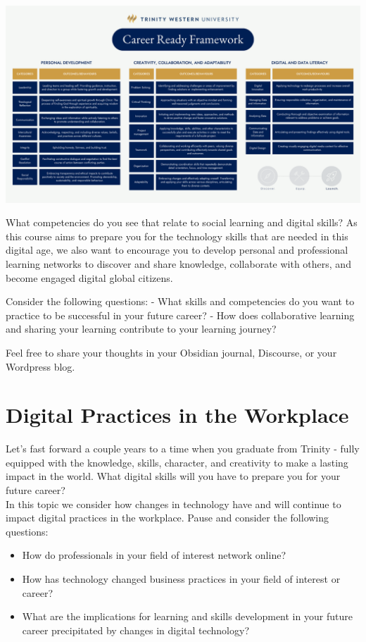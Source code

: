 \documentclass[
]{book}
\providecommand{\tightlist}{%
  \setlength{\itemsep}{0pt}\setlength{\parskip}{0pt}}
\theoremstyle{definition}
\theoremstyle{definition}
\theoremstyle{definition}
\theoremstyle{definition}
\theoremstyle{remark}
\begin{document}
\begin{reflect}
\includegraphics{assets/u6/Competency Framework.png}

What competencies do you see that relate to social learning and digital skills? As this course aims to prepare you for the technology skills that are needed in this digital age, we also want to encourage you to develop personal and professional learning networks to discover and share knowledge, collaborate with others, and become engaged digital global citizens.

Consider the following questions:
- What skills and competencies do you want to practice to be successful in your future career?
- How does collaborative learning and sharing your learning contribute to your learning journey?

Feel free to share your thoughts in your Obsidian journal, Discourse, or your Wordpress blog.
\end{reflect}

\hypertarget{digital-practices-in-the-workplace}{%
\section{Digital Practices in the Workplace}\label{digital-practices-in-the-workplace}}

Let's fast forward a couple years to a time when you graduate from Trinity - fully equipped with the knowledge, skills, character, and creativity to make a lasting impact in the world. What digital skills will you have to prepare you for your future career?\\
In this topic we consider how changes in technology have and will continue to impact digital practices in the workplace. Pause and consider the following questions:

\begin{itemize}
\tightlist
\item
  How do professionals in your field of interest network online?\\
\item
  How has technology changed business practices in your field of interest or career?\\
\item
  What are the implications for learning and skills development in your future career precipitated by changes in digital technology?
\end{itemize}
\end{document}

